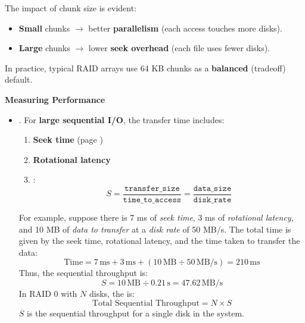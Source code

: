 \highspace
The impact of chunk size is evident:
\begin{itemize}
    \item \textbf{Small} chunks $\rightarrow$ better \textbf{parallelism} (each access touches more disks).
    \item \textbf{Large} chunks $\rightarrow$ lower \textbf{seek overhead} (each file uses fewer disks).
\end{itemize}
In practice, typical RAID arrays use 64 KB chunks as a \textbf{balanced} (tradeoff) default.

\newpage

\begin{flushleft}
    \textcolor{Green3}{ \textbf{Measuring Performance}}
\end{flushleft}
\begin{itemize}
    \item {}. For \textbf{large sequential I/O}, the transfer time includes:
    \begin{enumerate}
        \item \textbf{Seek time} (page \pageref{def: Seek Time})
        \item \textbf{Rotational latency}
        \item {}:
        \begin{equation}
            S = \dfrac{\texttt{transfer\_size}}{\texttt{time\_to\_access}} = \dfrac{\texttt{data\_size}}{\texttt{disk\_rate}}
        \end{equation}
    \end{enumerate}
    For example, suppose there is 7 ms of \emph{seek time}, 3 ms of \emph{rotational latency}, and 10 MB of \emph{data to transfer} at a \emph{disk rate} of 50 MB/s. The total time is given by the seek time, rotational latency, and the time taken to transfer the data:
    \begin{equation*}
        \text{Time} = 7\,\text{ms} + 3\,\text{ms} + \left( 10\,\text{MB} \div 50\,\text{MB/s} \right) = 210\,\text{ms}
    \end{equation*}
    Thus, the sequential throughput is:
    \begin{equation*}
        S = 10\,\text{MB} \div 0.21\,\text{s} = 47.62\,\text{MB/s}
    \end{equation*}
    In RAID 0 with $N$ disks, the  is:
    \begin{equation}
        \text{Total Sequential Throughput} = N \times S
    \end{equation}
    $S$ is the sequential throughput for a single disk in the system.



\end{itemize}
